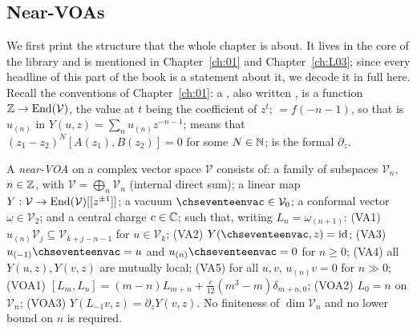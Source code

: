 \subsection{Near-VOAs}

We first print the structure that the whole chapter is about.  It lives in the core of the library and is
mentioned in Chapter~\ref{ch:01} and Chapter~\ref{ch:L03}; since every headline of this part of the book
is a statement about it, we decode it in full here.  Recall the conventions of Chapter~\ref{ch:01}: a
, also written , is a function ${\mathbb{Z}}\to\operatorname{End}(\mathcal V)$,
the value at $t$ being the coefficient of $z^t$;  $=f(-n-1)$, so that 
is $u_{(n)}$ in $Y(u,z)=\sum_nu_{(n)}z^{-n-1}$;  means that $(z_1-z_2)^N[A(z_1),B(z_2)]=0$
for some $N\in{\mathbb{N}}$;  is the formal $\partial_z$.

\begin{definition}\label{ch17:def:nearvoa}
A \emph{near-VOA} on a complex vector space $\mathcal V$ consists of: a family of subspaces
$\mathcal V_n$, $n\in{\mathbb{Z}}$, with $\mathcal V=\bigoplus_n\mathcal V_n$ (internal direct sum); a linear map
$Y:\mathcal V\to\operatorname{End}(\mathcal V)[[z^{\pm1}]]$; a vacuum $\chseventeenvac\in\mathcal V_0$; a conformal vector
$\omega\in\mathcal V_2$; and a central charge $c\in{\mathbb{C}}$; such that, writing $L_n=\omega_{(n+1)}$:
(VA1) $u_{(n)}\mathcal V_j\subseteq\mathcal V_{k+j-n-1}$ for $u\in\mathcal V_k$;
(VA2) $Y(\chseventeenvac,z)=\mathrm{id}$;
(VA3) $u_{(-1)}\chseventeenvac=u$ and $u_{(n)}\chseventeenvac=0$ for $n\ge0$;
(VA4) all $Y(u,z),Y(v,z)$ are mutually local;
(VA5) for all $u,v$, $u_{(n)}v=0$ for $n\gg0$;
(VOA1) $[L_m,L_n]=(m-n)L_{m+n}+\tfrac{c}{12}(m^3-m)\delta_{m+n,0}$;
(VOA2) $L_0=n$ on $\mathcal V_n$;
(VOA3) $Y(L_{-1}v,z)=\partial_zY(v,z)$.
No finiteness of $\dim\mathcal V_n$ and no lower bound on $n$ is required.
\end{definition}

